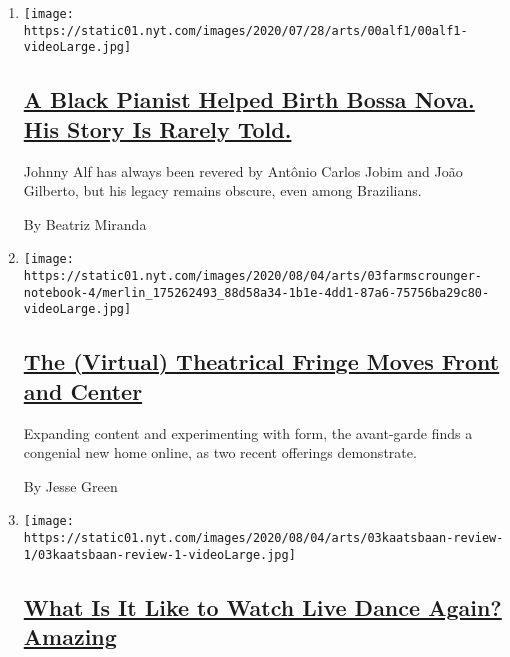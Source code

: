 \begin{enumerate}
\def\labelenumi{\arabic{enumi}.}
\item
  \texttt{[image: https://static01.nyt.com/images/2020/07/28/arts/00alf1/00alf1-videoLarge.jpg]}

  \hypertarget{a-black-pianist-helped-birth-bossa-nova-his-story-is-rarely-told}{%
  \subsection{\texorpdfstring{\href{/2020/08/04/arts/music/johnny-alf-bossa-nova.html}{A
  Black Pianist Helped Birth Bossa Nova. His Story Is Rarely
  Told.}}{A Black Pianist Helped Birth Bossa Nova. His Story Is Rarely Told.}}\label{a-black-pianist-helped-birth-bossa-nova-his-story-is-rarely-told}}

  Johnny Alf has always been revered by Antônio Carlos Jobim and João
  Gilberto, but his legacy remains obscure, even among Brazilians.

  By Beatriz Miranda
\item
  \texttt{[image: https://static01.nyt.com/images/2020/08/04/arts/03farmscrounger-notebook-4/merlin\_175262493\_88d58a34-1b1e-4dd1-87a6-75756ba29c80-videoLarge.jpg]}

  \hypertarget{the-virtual-theatrical-fringe-moves-front-and-center}{%
  \subsection{\texorpdfstring{\href{/2020/08/03/theater/virtual-theater.html}{The
  (Virtual) Theatrical Fringe Moves Front and
  Center}}{The (Virtual) Theatrical Fringe Moves Front and Center}}\label{the-virtual-theatrical-fringe-moves-front-and-center}}

  Expanding content and experimenting with form, the avant-garde finds a
  congenial new home online, as two recent offerings demonstrate.

  By Jesse Green
\item
  \texttt{[image: https://static01.nyt.com/images/2020/08/04/arts/03kaatsbaan-review-1/03kaatsbaan-review-1-videoLarge.jpg]}

  \hypertarget{what-is-it-like-to-watch-live-dance-again-amazing}{%
  \subsection{\texorpdfstring{\href{/2020/08/03/arts/dance/kaatsbaan-dance.html}{What
  Is It Like to Watch Live Dance Again?
  Amazing}}{What Is It Like to Watch Live Dance Again? Amazing}}\label{what-is-it-like-to-watch-live-dance-again-amazing}}


\end{enumerate}

